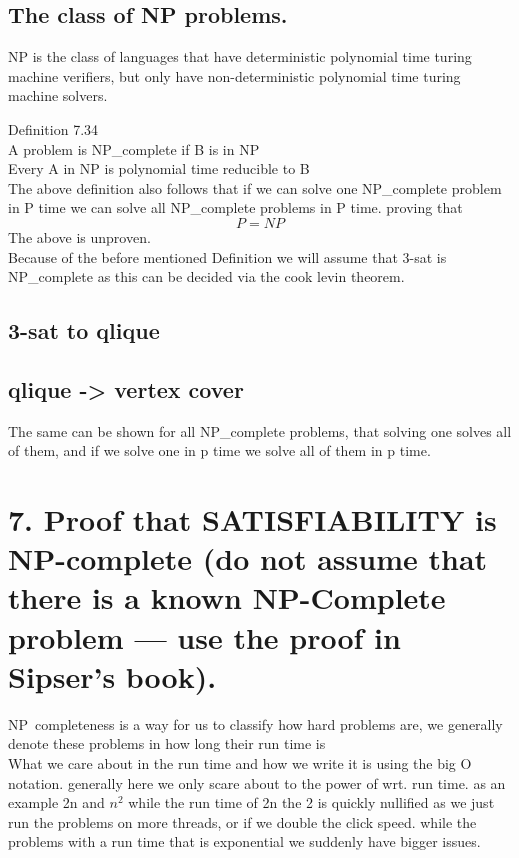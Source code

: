 \documentclass[a4paper,10pt,titlepage]{report}
\begin{document}
\subsection{The class of NP problems.}
NP is the class of languages that have deterministic polynomial time turing machine verifiers, but only have non-deterministic polynomial time turing machine solvers.

Definition 7.34\\
A problem is NP\_complete if B is in NP\\
Every A in NP is polynomial time reducible to B\\

The above definition also follows that if we can solve one NP\_complete problem in P time we can solve all NP\_complete problems in P time. proving that\\
\begin{equation}
P = NP
\end{equation}
The above is unproven. \\

Because of the before mentioned Definition we will assume that 3-sat is NP\_complete as this can be decided via the cook levin theorem.\\

\subsection{3-sat to qlique}

\subsection{qlique -> vertex cover}

The same can be shown for all NP\_complete problems, that solving one solves all of them, and if we solve one in p time we solve all of them in p time.


\newpage
\section{7. Proof that SATISFIABILITY is NP-complete (do not assume that
there is a known NP-Complete problem — use the proof in Sipser’s
book).}
NP\ completeness is a way for us to classify how hard problems are, we generally denote these problems in how long their run time is\\

What we care about in the run time and how we write it is using the big O notation. generally here we only scare about to the power of wrt. run time. as an example 2n and $n^2$ while the run time of 2n the 2 is quickly nullified as we just run the problems on more threads, or if we double the click speed. while the problems with a run time that is exponential we suddenly have bigger issues. 
\end{document}
